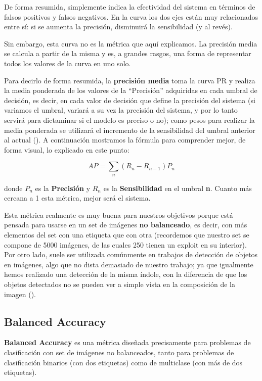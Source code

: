 De forma resumida, simplemente indica la efectividad del sistema en términos de falsos positivos y falsos negativos. En la curva los dos ejes están muy relacionados entre sí: si se aumenta la precisión, disminuirá la sensibilidad (y al revés).

Sin embargo, esta curva no es la métrica que aquí explicamos. La precisión media se calcula a partir de la misma y es, a grandes rasgos, una forma de representar todos los valores de la curva en uno solo.

Para decirlo de forma resumida, la \textbf{precisión media} toma la curva \ac{PR} y realiza la media ponderada de los valores de la ``Precisión'' adquiridas en cada umbral de decisión, es decir, en cada valor de decisión que define la precisión del sistema (si variamos el umbral, variará a su vez la precisión del sistema, y por lo tanto servirá para dictaminar si el modelo es preciso o no); como pesos para realizar la media ponderada se utilizará el incremento de la sensibilidad del umbral anterior al actual (\cite{apscore}). A continuación mostramos la fórmula para comprender mejor, de forma visual, lo explicado en este punto: %

\begin{equation}\label{eq:apscore}
AP = \sum_{n}(R_n - R_{n-1})P_n
\end{equation}

donde $P_n$ es la \textbf{Precisión} y $R_n$ es la \textbf{Sensibilidad} en el umbral \textbf{n}. Cuanto más cercana a 1 esta métrica, mejor será el sistema.

Esta métrica realmente es muy buena para nuestros objetivos porque está pensada para usarse en un set de imágenes \textbf{no balanceado}, es decir, con más elementos del set con una etiqueta que con otra (recordemos que nuestro set se compone de 5000 imágenes, de las cuales 250 tienen un exploit en su interior). Por otro lado, suele ser utilizada comúnmente en trabajos de detección de objetos en imágenes, algo que no dista demasiado de nuestro trabajo; ya que igualmente hemos realizado una detección de la misma índole, con la diferencia de que los objetos detectados no se pueden ver a simple vista en la composición de la imagen (\cite{apscore-2}).

\subsection{Balanced Accuracy}

\textbf{Balanced Accuracy} es una métrica diseñada precisamente para problemas de clasificación con set de imágenes no balanceados, tanto para problemas de clasificación binarios (con dos etiquetas) como de multiclase (con más de dos etiquetas).

